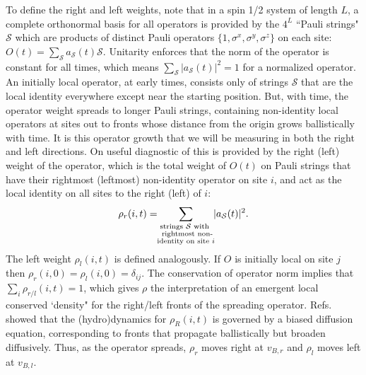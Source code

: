 \documentclass[aps,prx,reprint,superscriptaddress, longbibliography]{revtex4-1}
\newcommand{\mc}[1]{ { \mathcal {{#1}}}}
\begin{document}
To define the right and left weights, note that in a spin 1/2 system of length $L$, a complete orthonormal basis for all operators is provided by the $4^L$ ``Pauli strings" $\mathcal{S}$ which are products of distinct Pauli operators $\{1, \sigma^x, \sigma^y, \sigma^z \}$ on each site:
$O(t) = \sum_{\mathcal{S}} a_\mathcal{S}(t) \mathcal{S}$. Unitarity enforces that the norm of the operator is constant for all times, which means $\sum_{\mathcal{S}} |a_\mathcal{S}(t)|^2 =1$ for a normalized operator. 
An initially local operator, at early times, consists only of strings $\mathcal{S}$ that are the local identity everywhere except near the starting position. But, with time, the operator weight spreads to longer Pauli strings, containing
non-identity local operators at sites out to fronts whose distance from the origin grows ballistically with time. It is this operator growth that we will be measuring in both the right and left directions. On useful diagnostic of this is provided by the right (left) weight of the operator, which is the total weight of $O(t)$ on Pauli strings that have their rightmost (leftmost) non-identity operator on site $i$, and act as the local identity on all sites to the right (left) of $i$:
\begin{align}
\rho_r(i,t)= \sum_{\substack{{\text{strings $\mc{S}$ with } }\\ \mathclap{\text{ rightmost non-}}\\ \mathclap{\text{identity on site $i$}}}} |a_\mc{S}(t)|^2.
\end{align}
The left weight $\rho_l(i,t)$ is defined analogously.  If $ O$ is initially local on site $j$ then $\rho_r(i,0) = \rho_l(i,0) = \delta_{ij}$. The conservation of operator norm implies that $\sum_i \rho_{r/l}(i,t)=1$, which gives $\rho$ the interpretation of an emergent local conserved `density" for the right/left fronts of the spreading operator. Refs.\cite{opspreadAdam, opspreadCurt} showed that the (hydro)dynamics for $\rho_R(i,t)$ is governed by a biased diffusion equation, corresponding to fronts that propagate ballistically but broaden diffusively. Thus, as the operator spreads, $\rho_r$ moves right at $v_{B,r}$ and $\rho_l$ moves left at $v_{B,l}$. 
\end{document}

